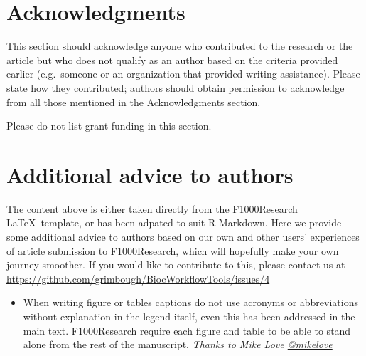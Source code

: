 \documentclass[9pt,a4paper,]{extarticle}
\begin{document}
\hypertarget{acknowledgments}{%
\section{Acknowledgments}\label{acknowledgments}}

This section should acknowledge anyone who contributed to the research or the article but who does not qualify as an author based on the criteria provided earlier (e.g.~someone or an organization that provided writing assistance). Please state how they contributed; authors should obtain permission to acknowledge from all those mentioned in the Acknowledgments section.

Please do not list grant funding in this section.

\hypertarget{additional-advice-to-authors}{%
\section{Additional advice to authors}\label{additional-advice-to-authors}}

The content above is either taken directly from the F1000Research \LaTeX~template, or has been adpated to suit R Markdown. Here we provide some additional advice to authors based on our own and other users' experiences of article submission to F1000Research, which will hopefully make your own journey smoother. If you would like to contribute to this, please contact us at \url{https://github.com/grimbough/BiocWorkflowTools/issues/4}

\begin{itemize}
\item
  When writing figure or tables captions do not use acronyms or abbreviations without explanation in the legend itself, even this has been addressed in the main text. F1000Research require each figure and table to be able to stand alone from the rest of the manuscript. \emph{Thanks to Mike Love \href{https://twitter.com/mikelove}{@mikelove}}
\end{itemize}


\end{document}
